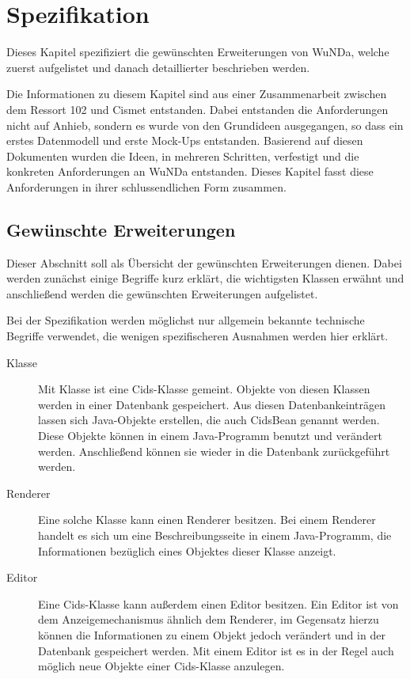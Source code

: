 \chapter{Spezifikation} \label{ch:spezi}
Dieses Kapitel spezifiziert die gewünschten Erweiterungen von \ac{WuNDa}, welche zuerst aufgelistet und danach detaillierter beschrieben werden.

Die Informationen zu diesem Kapitel sind aus einer Zusammenarbeit zwischen dem Ressort 102 und Cismet entstanden.
Dabei entstanden die Anforderungen nicht auf Anhieb, sondern es wurde von den Grundideen ausgegangen, so dass ein erstes Datenmodell und erste Mock-Ups entstanden.
Basierend auf diesen Dokumenten wurden die Ideen, in mehreren Schritten, verfestigt und die konkreten Anforderungen an \ac{WuNDa} entstanden.
Dieses Kapitel fasst diese Anforderungen in ihrer schlussendlichen Form zusammen. 

\section{Gewünschte Erweiterungen} \label{sec:gewuenschte-erweiterungen}
Dieser Abschnitt soll als Übersicht der gewünschten Erweiterungen dienen.
Dabei werden zunächst einige Begriffe kurz erklärt, die wichtigsten Klassen erwähnt und anschließend werden die gewünschten Erweiterungen aufgelistet.

Bei der Spezifikation werden möglichst nur allgemein bekannte technische Begriffe verwendet, die wenigen spezifischeren Ausnahmen werden hier erklärt.
\begin{description}
\item[Klasse] Mit Klasse ist eine Cids-Klasse gemeint. Objekte von diesen Klassen werden in einer Datenbank gespeichert.
Aus diesen Datenbankeinträgen lassen sich Java-Objekte erstellen, die auch CidsBean genannt werden.
Diese Objekte können in einem Java-Programm benutzt und verändert werden.
Anschließend können sie wieder in die Datenbank zurückgeführt werden.
\item[Renderer] Eine solche Klasse kann einen Renderer besitzen. Bei einem Renderer handelt es sich um eine Beschreibungsseite in einem Java-Programm, die Informationen bezüglich eines Objektes dieser Klasse anzeigt.
\item[Editor] Eine Cids-Klasse kann außerdem einen Editor besitzen. Ein Editor ist von dem Anzeigemechanismus ähnlich dem Renderer, im Gegensatz hierzu können die Informationen zu einem Objekt jedoch verändert und in der Datenbank gespeichert werden. Mit einem Editor ist es in der Regel auch möglich neue Objekte einer Cids-Klasse anzulegen. 
\end{description}

